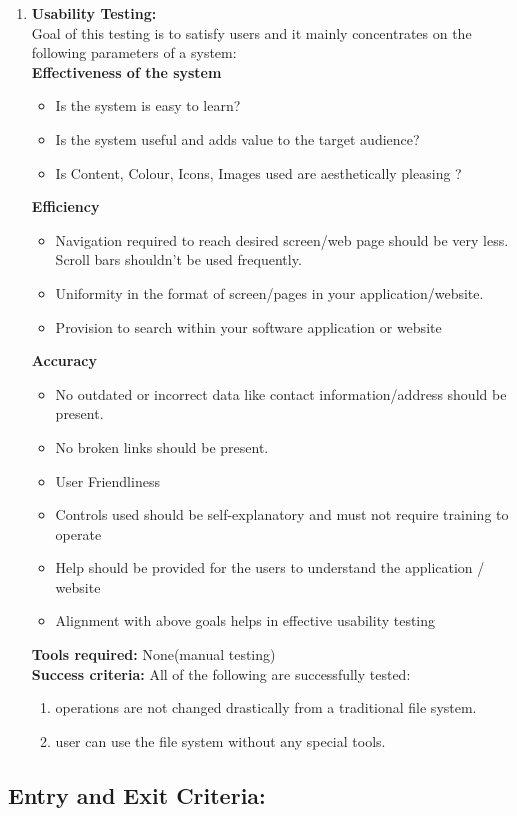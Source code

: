 \begin{enumerate}
\item \textbf{Usability Testing:} \\
Goal of this testing is to satisfy users and it mainly concentrates on the following parameters of a system: \\
\textbf{Effectiveness of the system}
\begin{itemize}
\item Is the system is easy to learn?
\item Is the system useful and adds value to the target audience?
\item Is Content, Colour, Icons, Images used are aesthetically pleasing ?
\end{itemize}
\textbf{Efficiency}
\begin{itemize}
\item Navigation required to reach desired screen/web page should be very less. Scroll bars shouldn’t be used frequently.
\item Uniformity in the format of screen/pages in your application/website.
\item Provision to search within your software application or website
\end{itemize}
\textbf{Accuracy}
\begin{itemize}
\item No outdated or incorrect data like contact information/address should be present.
\item No broken links should be present.
\item User Friendliness
\item Controls used should be self-explanatory and must not require training to operate
\item Help should be provided for the users to understand the application / website
\item Alignment with above goals helps in effective usability testing
\end{itemize}
\textbf{Tools required:} None(manual testing) \\
\textbf{Success criteria:} All of the following are successfully tested:
\begin{enumerate}
\item operations are not changed drastically from a traditional file system.
\item user can use the file system without any special tools.
\end{enumerate}
\end{enumerate}

\subsection{Entry and Exit Criteria:}


